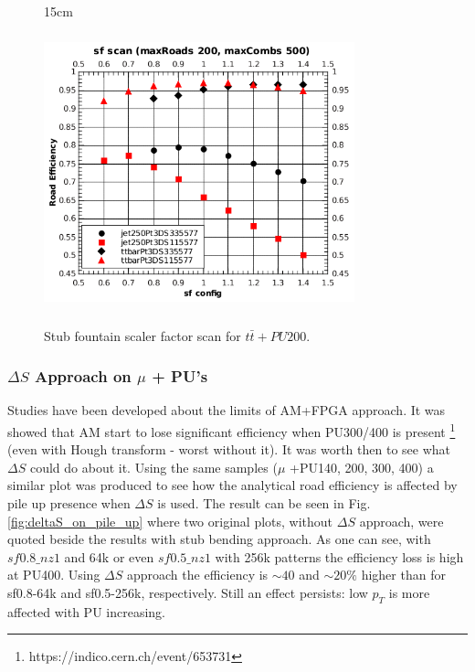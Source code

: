 \begin{figure}[htbp]{15cm}
	\caption{Stub fountain scaler factor scan for $t\bar{t}+PU200$.}
	\centering
	\includegraphics[width=9cm,height=8cm]{AppendixCMSL1TT/figs/sf_scans_with_DS_maxRoads200_maxCombs500}
	\label{fig:deltaS_sf_scan}	
\end{figure}


\subsubsection{$\Delta S$ Approach on $\mu$ + PU's}
Studies have been developed about the limits of AM+FPGA approach. It was showed that AM start to lose significant efficiency when PU300/400 is present \footnote{https://indico.cern.ch/event/653731} (even with Hough transform - worst without it). It was worth then to see what $\Delta S$ could do about it. Using the same samples ($\mu$ +PU140, 200, 300, 400) a similar plot was produced to see how the analytical road efficiency is affected by pile up presence when $\Delta S$ is used. The result can be seen in Fig.\ref{fig:deltaS_on_pile_up} where two original plots, without $\Delta S$ approach, were quoted beside the results with stub bending approach. As one can see, with $sf0.8\_nz1$ and 64k or even $sf0.5\_nz1$ with 256k patterns the efficiency loss is high at PU400. Using $\Delta S$ approach the efficiency is $\sim40$ and $\sim20\%$ higher than for sf0.8-64k and sf0.5-256k, respectively. Still an effect persists: low $p_{T}$ is more affected with PU increasing.

